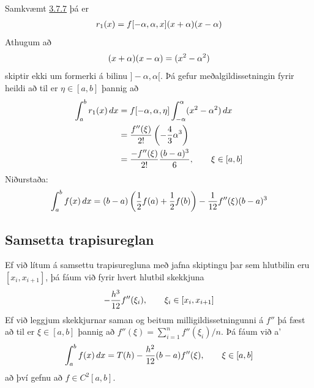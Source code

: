 \documentclass[letterpaper,10pt,icelandic]{sphinxmanual}
\begin{document}
Samkvæmt \href{https://notendur.hi.is/~bsm/stae405/kafli03.html\#id9}{3.7.7} þá er
\begin{gather}
\begin{split}r_1(x) = f[-\alpha, \alpha, x](x+\alpha)(x-\alpha)\end{split}\notag
\end{gather}
Athugum að
\begin{gather}
\begin{split}(x+\alpha)(x-\alpha) = (x^2 - \alpha^2)\end{split}\notag
\end{gather}
skiptir ekki um formerki á bilinu \(]-\alpha, \alpha[\). Þá gefur
meðalgildissetningin fyrir heildi að til er \(\eta \in [a,b]\)
þannig að
\begin{gather}
\begin{split}\begin{aligned}
  \int_a^b r_1(x)\,dx
  &= f[-\alpha, \alpha, \eta]
  \int_{-\alpha}^{\alpha}(x^2 - \alpha^2)\,dx\\
  &= \frac{f''(\xi)}{2!} \left( - \frac{4}{3}\alpha^3 \right)\\
  &= \frac{-f''(\xi)}{2!}\frac{(b-a)^3}{6}, \qquad \xi \in [a,b]\end{aligned}\end{split}\notag
\end{gather}
Niðurstaða:
\begin{gather}
\begin{split}\int_a^b f(x)\,dx = (b-a)
  \left( \frac{1}{2} f(a) + \frac{1}{2}f(b) \right)
  - \frac{1}{12} f''(\xi)(b-a)^3\end{split}\notag
\end{gather}

\subsection{Samsetta trapisureglan}
\label{kafli05:id5}
Ef við lítum á samsettu trapisuregluna með jafna skiptingu þar sem
hlutbilin eru \([x_i,
x_{i+1}]\), þá fáum við fyrir hvert hlutbil skekkjuna
\begin{gather}
\begin{split}- \frac{h^3}{12}f''(\xi_i), \qquad \xi_i \in [x_i, x_{i+1}]\end{split}\notag
\end{gather}
Ef við leggjum skekkjurnar saman og beitum milligildissetningunni á
\(f''\) þá fæst að til er \(\xi \in [a,b]\) þannig að
\(f''(\xi) = \sum_{i=1}^n f''(\xi_i)/n\).
Þá fáum við a'
\begin{gather}
\begin{split}\int_a^b f(x)\,dx = T(h) - \frac{h^2}{12}(b-a)f''(\xi), \qquad
  \xi \in [a,b]\end{split}\notag
\end{gather}
að því gefnu að \(f\in C^2 [a,b]\).
\end{document}
